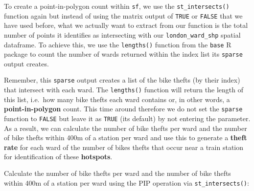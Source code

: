 \documentclass[
]{book}
\newenvironment{Shaded}{\begin{snugshade}}{\end{snugshade}}
\newcommand{\CommentTok}[1]{\textcolor[rgb]{0.56,0.35,0.01}{\textit{#1}}}
\newcommand{\ConstantTok}[1]{\textcolor[rgb]{0.00,0.00,0.00}{#1}}
\newcommand{\FunctionTok}[1]{\textcolor[rgb]{0.00,0.00,0.00}{#1}}
\newcommand{\NormalTok}[1]{#1}
\newcommand{\OtherTok}[1]{\textcolor[rgb]{0.56,0.35,0.01}{#1}}
\newcommand{\SpecialCharTok}[1]{\textcolor[rgb]{0.00,0.00,0.00}{#1}}
\begin{document}
To create a point-in-polygon count within \texttt{sf}, we use the \texttt{st\_intersects()} function again but instead of using the matrix output of \texttt{TRUE} or \texttt{FALSE} that we have used before, what we actually want to extract from our function is the total number of points it identifies as intersecting with our \texttt{london\_ward\_shp} spatial dataframe. To achieve this, we use the \texttt{lengths()} function from the \texttt{base} R package to count the number of wards returned within the index list its \texttt{sparse} output creates.

Remember, this \texttt{sparse} output creates a list of the bike thefts (by their index) that intersect with each ward. The \texttt{lengths()} function will return the length of this list, i.e.~how many bike thefts each ward contains or, in other words, a \textbf{point-in-polygon} count. This time around therefore we do not set the \texttt{sparse} function to \texttt{FALSE} but leave it as \texttt{TRUE} (its default) by not entering the parameter. As a result, we can calculate the number of bike thefts per ward and the number of bike thefts within 400m of a station per ward and use this to generate a \textbf{theft rate} for each ward of the number of bikes thefts that occur near a train station for identification of these \textbf{hotspots}.

Calculate the number of bike thefts per ward and the number of bike thefts within 400m of a station per ward using the PIP operation via \texttt{st\_intersects()}:

\begin{Shaded}
\end{Shaded}
\end{document}
